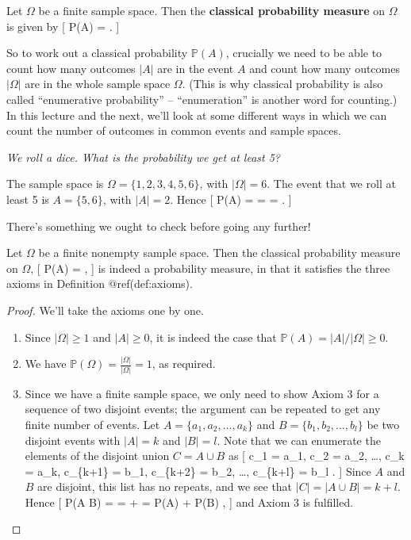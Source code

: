 \documentclass[
  letterpaper,
  DIV=11,
  numbers=noendperiod]{scrreprt}
\providecommand{\tightlist}{%
  \setlength{\itemsep}{0pt}\setlength{\parskip}{0pt}}\usepackage{longtable,booktabs,array}
\theoremstyle{remark}
\begin{document}
Let \(\Omega\) be a finite sample space. Then the \textbf{classical
probability measure} on \(\Omega\) is given by {[} \mathbb P(A) =
 . {]}

So to work out a classical probability \(\mathbb P(A)\), crucially we
need to be able to count how many outcomes \(|A|\) are in the event
\(A\) and count how many outcomes \(|\Omega|\) are in the whole sample
space \(\Omega\). (This is why classical probability is also called
``enumerative probability'' -- ``enumeration'' is another word for
counting.) In this lecture and the next, we'll look at some different
ways in which we can count the number of outcomes in common events and
sample spaces.

\emph{We roll a dice. What is the probability we get at least 5?}

The sample space is \(\Omega = \{1,2,3,4,5,6\}\), with \(|\Omega| = 6\).
The event that we roll at least 5 is \(A = \{5,6\}\), with \(|A| = 2\).
Hence {[} \mathbb P(A) =  =  =
 . {]}

There's something we ought to check before going any further!

Let \(\Omega\) be a finite nonempty sample space. Then the classical
probability measure on \(\Omega\), {[} \mathbb P(A) =
 , {]} is indeed a probability measure, in that it
satisfies the three axioms in Definition @ref(def:axioms).

\begin{proof}

We'll take the axioms one by one.

\begin{enumerate}
\def\labelenumi{\arabic{enumi}.}
\tightlist
\item
  Since \(|\Omega| \geq 1\) and \(|A| \geq 0\), it is indeed the case
  that \(\mathbb P(A) = |A|/|\Omega| \geq 0\).
\item
  We have
  \({\displaystyle \mathbb P(\Omega) = \frac{|\Omega|}{|\Omega|} = 1}\),
  as required.
\item
  Since we have a finite sample space, we only need to show Axiom 3 for
  a sequence of two disjoint events; the argument can be repeated to get
  any finite number of events. Let \(A = \{a_1, a_2, \dots, a_k\}\) and
  \(B = \{b_1, b_2, \dots, b_l\}\) be two disjoint events with
  \(|A| = k\) and \(|B| = l\). Note that we can enumerate the elements
  of the disjoint union \(C = A \cup B\) as {[} c\_1 = a\_1, c\_2 =
  a\_2, \dots, c\_k = a\_k, c\_\{k+1\} = b\_1, c\_\{k+2\} = b\_2, \dots,
  c\_\{k+l\} = b\_l . {]} Since \(A\) and \(B\) are disjoint, this list
  has no repeats, and we see that \(|C| = |A \cup B| = k+l\). Hence {[}
  \mathbb P(A \cup B) =  =  +
   = \mathbb P(A) + \mathbb P(B) , {]} and Axiom 3 is
  fulfilled.
\end{enumerate}

\end{proof}
\end{document}
